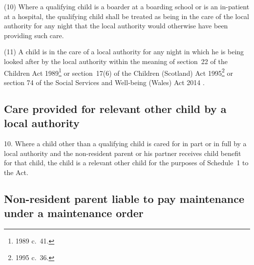 \documentclass[12pt,a4paper]{article}
\begin{document}
(10) Where a qualifying child is a boarder at a boarding school or is an in-patient at a hospital, the qualifying child shall be treated as being in the care of the local authority for any night that the local authority would otherwise have been providing such care.

(11) A child is in the care of a local authority for any night in which he is being looked after by the local authority within the meaning of section~22 of the Children Act 1989\footnote{1989 c.\ 41.} or section~17(6) of the Children (Scotland) Act 1995\footnote{1995 c.\ 36.}
or section 74 of the Social Services and Well-being (Wales) Act 2014%
.


\subsection[10. Care provided for relevant other child by a local authority]{Care provided for relevant other child by a local authority}

10.  Where a child other than a qualifying child is cared for in part or in full by a local authority and the non-resident parent or his partner receives child benefit for that child, the child is a relevant other child for the purposes of Schedule~1 to the Act.

\subsection[11. Non-resident parent liable to pay maintenance under a maintenance order]{\sloppy{} Non-resident parent liable to pay maintenance under a maintenance order}
\end{document}
